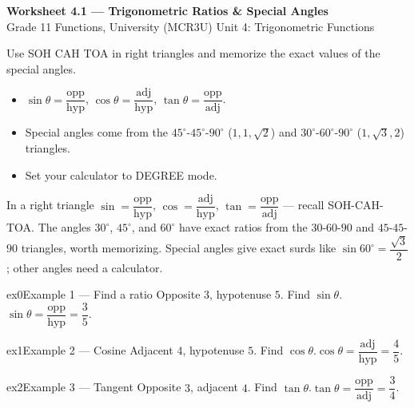 \documentclass[11pt]{article}
\begin{document}
\begin{center}
{\LARGE\bfseries\color{titleblue}Worksheet 4.1 --- Trigonometric Ratios \& Special Angles}\\[2pt]
{\small Grade 11 Functions, University (MCR3U) \textperiodcentered{} Unit 4: Trigonometric Functions}
\end{center}

\begin{ideabox}
Use SOH CAH TOA in right triangles and memorize the exact values of the special angles.
\begin{itemize}[leftmargin=*,itemsep=2pt]
  \item $\sin\theta=\dfrac{\text{opp}}{\text{hyp}}$, $\cos\theta=\dfrac{\text{adj}}{\text{hyp}}$, $\tan\theta=\dfrac{\text{opp}}{\text{adj}}$.
  \item Special angles come from the $45^\circ$-$45^\circ$-$90^\circ$ ($1,1,\sqrt2$) and $30^\circ$-$60^\circ$-$90^\circ$ ($1,\sqrt3,2$) triangles.
  \item Set your calculator to DEGREE mode.
\end{itemize}
\end{ideabox}

\begin{learnbox}
In a right triangle $\sin=\dfrac{\text{opp}}{\text{hyp}}$, $\cos=\dfrac{\text{adj}}{\text{hyp}}$, $\tan=\dfrac{\text{opp}}{\text{adj}}$ — recall SOH-CAH-TOA.
The angles $30^\circ$, $45^\circ$, and $60^\circ$ have exact ratios from the $30$-$60$-$90$ and $45$-$45$-$90$ triangles, worth memorizing.
Special angles give exact surds like $\sin60^\circ=\dfrac{\sqrt3}{2}$; other angles need a calculator.
\end{learnbox}


\begin{example}{ex0}{Example 1 --- Find a ratio}
Opposite $3$, hypotenuse $5$. Find $\sin\theta$.\soln $\sin\theta=\dfrac{\text{opp}}{\text{hyp}}=\dfrac{3}{5}$.
\end{example}

\begin{example}{ex1}{Example 2 --- Cosine}
Adjacent $4$, hypotenuse $5$. Find $\cos\theta$.\soln $\cos\theta=\dfrac{\text{adj}}{\text{hyp}}=\dfrac{4}{5}$.
\end{example}

\begin{example}{ex2}{Example 3 --- Tangent}
Opposite $3$, adjacent $4$. Find $\tan\theta$.\soln $\tan\theta=\dfrac{\text{opp}}{\text{adj}}=\dfrac{3}{4}$.
\end{example}
\end{document}
